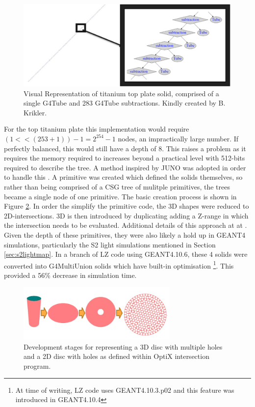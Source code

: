 \begin{figure}[!htbp]
\includegraphics[width=\textwidth]{Figures/Simulations/unbalanced_ptfe.png}
\centering
\caption{Visual Representation of titanium top plate solid, comprised of a single G4Tube and 283 G4Tube subtractions. Kindly created by B. Krikler.}
\label{fig:Opticks_unbalanced_shape}
\end{figure}
For the top titanium plate this implementation would require $(1 << (253 + 1))-1 = 2^{254} - 1$ nodes, an impractically large number.
If perfectly balanced, this would still have a depth of 8.
This raises a problem as it requires the memory required to increases beyond a practical level with 512-bits required to describe the tree.
A method inspired by JUNO was adopted in order to handle this \cite{Opticks_CHEP_2021_ref}.
A primitive was created which defined the solids themselves, so rather than being comprised of a CSG tree of mulitple primitives, the trees became a single node of one primitive.
The basic creation process is shown in Figure \ref{fig:Opticks_PTFE_primative}.
In order the simplify the primitive code, the 3D shapes were reduced to 2D-intersections.
3D is then introduced by duplicating adding a Z-range in which the intersection needs to be evaluated.
Additional details of this approach at at \cite{optix_primitive_code_ref}.
Given the depth of these primitives, they were also likely a hold up in GEANT4 simulations, particularly the S2 light simulations mentioned in Section \ref{sec:s2lightmap}.
In a branch of LZ code using GEANT4.10.6, these 4 solids were converted into G4MultiUnion solids which have built-in optimisation \cite{multiunion_ref}\footnote{At time of writing, LZ code uses GEANT4.10.3.p02 and this feature was introduced in GEANT4.10.4}.
This provided a 56\% decrease in simulation time.
\begin{figure}[!htbp]
\includegraphics[width=0.7\textwidth]{Figures/Simulations/opticks_PTFE_primative.png}
\centering
\caption{Development stages for representing a 3D disc with multiple holes and a 2D disc with holes as defined within OptiX intersection program.}
\label{fig:Opticks_PTFE_primative}
\end{figure}

